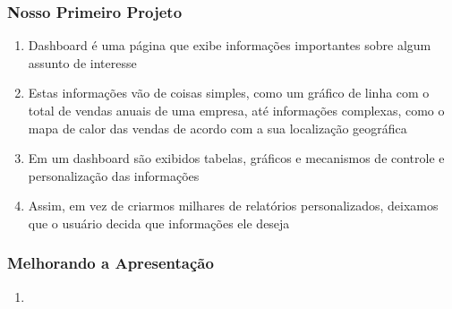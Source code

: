 \documentclass[12pt, compress, usetitleprogressbar]{beamer}\usepackage[]{graphicx}\usepackage[]{color}
\begin{document}

\begin{frame}

\frametitle{Nosso Primeiro Projeto}

\begin{enumerate}[label=$\bullet$, leftmargin=*]

  \item \alert{Dashboard} é uma página que exibe informações importantes sobre algum assunto de interesse

  \item Estas informações vão de coisas simples, como um gráfico de linha com o total de vendas anuais de uma empresa, até informações complexas, como o mapa de calor das vendas de acordo com a sua localização geográfica

  \item Em um dashboard são exibidos tabelas, gráficos e mecanismos de controle e personalização das informações

  \item Assim, em vez de criarmos milhares de relatórios personalizados, deixamos que o usuário decida que informações ele deseja 

\end{enumerate}

\end{frame}



























\begin{frame}

\frametitle{Melhorando a Apresentação}

\begin{enumerate}[label=$\bullet$, leftmargin=*]

  \item 

\end{enumerate}

\end{frame}
\end{document}
